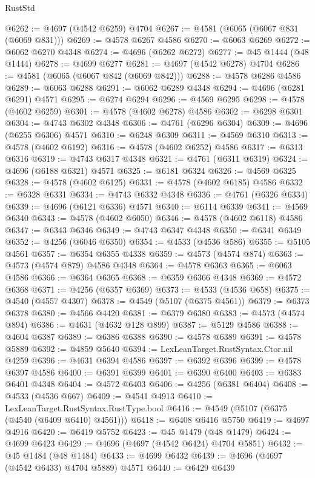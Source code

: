 \begin{lexlean}{RustStd}
\begin{coremodule}
@6262 := @4697 (@4542 @6259) @4704
@6267 := @4581 (@6065 (@6067 @831 (@6069 @831)))
@6269 := @4578 @6267 @4586
@6270 := @6063 @6269
@6272 := @6062 @6270 @4348
@6274 := @4696 (@6262 @6272)
@6277 := @45 @1444 (@48 @1444)
@6278 := @4699 @6277
@6281 := @4697 (@4542 @6278) @4704
@6286 := @4581 (@6065 (@6067 @842 (@6069 @842)))
@6288 := @4578 @6286 @4586
@6289 := @6063 @6288
@6291 := @6062 @6289 @4348
@6294 := @4696 (@6281 @6291) @4571
@6295 := @6274 @6294
@6296 := @4569 @6295
@6298 := @4578 (@4602 @6259)
@6301 := @4578 (@4602 @6278) @4586
@6302 := @6298 @6301
@6304 := @4743 @6302 @4348
@6306 := @4761 (@6296 @6304)
@6309 := @4696 (@6255 @6306) @4571
@6310 := @6248 @6309
@6311 := @4569 @6310
@6313 := @4578 (@4602 @6192)
@6316 := @4578 (@4602 @6252) @4586
@6317 := @6313 @6316
@6319 := @4743 @6317 @4348
@6321 := @4761 (@6311 @6319)
@6324 := @4696 (@6188 @6321) @4571
@6325 := @6181 @6324
@6326 := @4569 @6325
@6328 := @4578 (@4602 @6125)
@6331 := @4578 (@4602 @6185) @4586
@6332 := @6328 @6331
@6334 := @4743 @6332 @4348
@6336 := @4761 (@6326 @6334)
@6339 := @4696 (@6121 @6336) @4571
@6340 := @6114 @6339
@6341 := @4569 @6340
@6343 := @4578 (@4602 @6050)
@6346 := @4578 (@4602 @6118) @4586
@6347 := @6343 @6346
@6349 := @4743 @6347 @4348
@6350 := @6341 @6349
@6352 := @4256 (@6046 @6350)
@6354 := @4533 (@4536 @586)
@6355 := @5105 @4561
@6357 := @6354 @6355 @4338
@6359 := @4573 (@4574 @874)
@6363 := @4573 (@4574 @879) @4586 @4348
@6364 := @4578 @6363
@6365 := @6063 @4586
@6366 := @6364 @6365
@6368 := @6359 @6366 @4348
@6369 := @4572 @6368
@6371 := @4256 (@6357 @6369)
@6373 := @4533 (@4536 @658)
@6375 := @4540 (@4557 @4307)
@6378 := @4549 (@5107 (@6375 @4561))
@6379 := @6373 @6378
@6380 := @4566 @4420
@6381 := @6379 @6380
@6383 := @4573 (@4574 @894)
@6386 := @4631 (@4632 @128 @899)
@6387 := @5129 @4586
@6388 := @4604 @6387
@6389 := @6386 @6388
@6390 := @4578 @6389
@6391 := @4578 @5889
@6392 := @4859 @5640
@6394 := LexLeanTarget.RustSyntax.Ctor.nil @4259
@6396 := @4631 @6394 @4586
@6397 := @6392 @6396
@6399 := @4578 @6397 @4586
@6400 := @6391 @6399
@6401 := @6390 @6400
@6403 := @6383 @6401 @4348
@6404 := @4572 @6403
@6406 := @4256 (@6381 @6404)
@6408 := @4533 (@4536 @667)
@6409 := @4541 @4913
@6410 := LexLeanTarget.RustSyntax.RustType.bool
@6416 := @4549 (@5107 (@6375 (@4540 (@6409 @6410) @4561)))
@6418 := @6408 @6416 @5750
@6419 := @4697 @4916
@6420 := @6419 @5752
@6423 := @45 @1479 (@48 @1479)
@6424 := @4699 @6423
@6429 := @4696 (@4697 (@4542 @6424) @4704 @5851)
@6432 := @45 @1484 (@48 @1484)
@6433 := @4699 @6432
@6439 := @4696 (@4697 (@4542 @6433) @4704 @5889) @4571
@6440 := @6429 @6439

\end{coremodule}
\end{lexlean}
